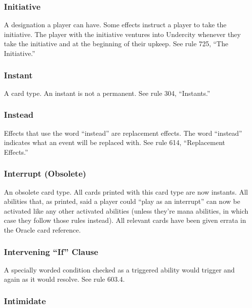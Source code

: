{{{{{{{{{{{{{{{{{\subsubsection*{Initiative}

A designation a player can have. Some effects instruct a player to take the initiative. The player with the initiative ventures into Undercity whenever they take the initiative and at the beginning of their upkeep. See rule 725, “The Initiative.”

\subsubsection*{Instant}

A card type. An instant is not a permanent. See rule 304, “Instants.”

\subsubsection*{Instead}

Effects that use the word “instead” are replacement effects. The word “instead” indicates what an event will be replaced with. See rule 614, “Replacement Effects.”

\subsubsection*{Interrupt (Obsolete)}

An obsolete card type. All cards printed with this card type are now instants. All abilities that, as printed, said a player could “play as an interrupt” can now be activated like any other activated abilities (unless they’re mana abilities, in which case they follow those rules instead). All relevant cards have been given errata in the Oracle card reference.

\subsubsection*{Intervening “If” Clause}

A specially worded condition checked as a triggered ability would trigger and again as it would resolve. See rule 603.4.

\subsubsection*{Intimidate}

}}}}}}}}}}}}}}}}}
